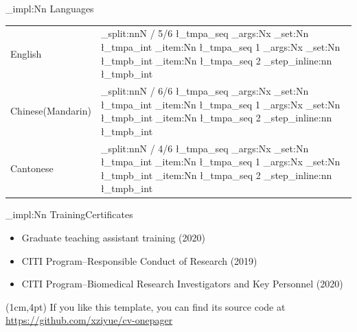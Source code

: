 \documentclass[11pt]{article}
\newcommand{\skillbar}[1]{
    \regex_split:nnN {/} {#1} \l_tmpa_seq
    \exp_args:Nx \int_set:Nn \l_tmpa_int {\seq_item:Nn \l_tmpa_seq {1}}
    \exp_args:Nx \int_set:Nn \l_tmpb_int {\seq_item:Nn \l_tmpa_seq {2}}
    \int_step_inline:nn {\l_tmpb_int} {
        \int_compare:nTF {##1 <=\l_tmpa_int} {
            \tcbox[skillbarbox]{\hspace*{1em}}\hspace{1ex}
        } {
            \tcbox[skillbarbox, colback=c-skill-gray]{\hspace*{1em}}\hspace{1ex}
        }
    }
}
\newcommand{\cvhead}[1]{\cvhead_impl:Nn \Large {#1}}
\begin{document}
{\begin{minipage}[t]{0.48\linewidth}
\cvhead{Languages}
{
\renewcommand{\arraystretch}{1.5}
\setlength{\tabcolsep}{0pt}
\begin{tabular}{l<{\hspace{8mm}}l}
English & \skillbar{5/6}\\
Chinese(Mandarin) & \skillbar{6/6}\\
Cantonese & \skillbar{4/6}
\end{tabular}
}

\cvhead{Training\raisebox{2pt}{/}Certificates}
\begin{itemize}
\item Graduate teaching assistant training (2020)
\item CITI Program--Responsible Conduct of Research (2019)
\item CITI Program--Biomedical Research Investigators and Key Personnel
(2020)
\end{itemize}


\end{minipage}
}

\begin{textblock*}{\linewidth}(1cm,4pt)
\footnotesize If you like this template, you can find its source code at \href{https://github.com/xziyue/cv-onepager}{https://github.com/xziyue/cv-onepager}
\end{textblock*}
\end{document}
